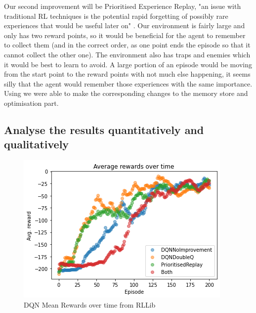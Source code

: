 \documentclass[a4pape, 11pt, english]{article}
\begin{document}
Our second improvement will be Prioritised Experience Replay, "an issue with traditional RL techniques is the potential rapid forgetting of possibly rare experiences that would be useful later on" \citep[p 1]{schaul_prioritized_2015}. Our environment is fairly large and only has two reward points, so it would be beneficial for the agent to remember to collect them (and in the correct order, as one point ends the episode so that it cannot collect the other one). The environment also has traps and enemies which it would be best to learn to avoid. A large portion of an episode would be moving from the start point to the reward points with not much else happening, it seems silly that the agent would remember those experiences with the same importance. Using \citep[algorithm 1]{schaul_prioritized_2015} we were able to make the corresponding changes to the memory store and optimisation part.

\subsection{Analyse the results quantitatively and qualitatively}

\begin{figure}[h!]
	\begin{center}
		\includegraphics{img/DQNRewardsOverTime.png}
		\caption{DQN Mean Rewards over time from RLLib}
		\label{fig:DQNRewardsOverTime}
	\end{center}
\end{figure}
\end{document}
